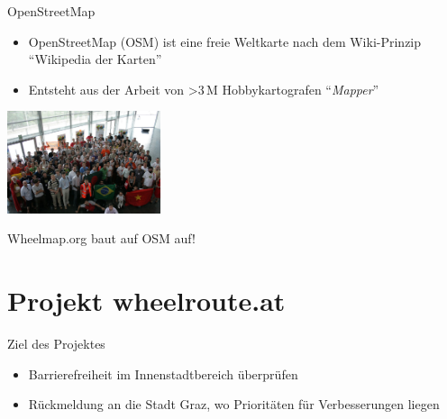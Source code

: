 \documentclass{beamer}
\begin{document}
\begin{frame}{OpenStreetMap}


  \begin{itemize}
        \item OpenStreetMap (OSM) ist eine freie Weltkarte nach dem Wiki-Prinzip "`Wikipedia der Karten"'
          \pause
            \item Entsteht aus der Arbeit von \textgreater 3\,M Hobbykartografen "`\emph{Mapper}"'
          \end{itemize}

           \begin{center}
              \includegraphics[width=4.5cm]{sotm.jpg}
               \end{center}

             \pause
  Wheelmap.org baut auf OSM auf!

\end{frame}

\section{Projekt wheelroute.at}

\begin{frame}{Ziel des Projektes}

    \begin{itemize}
       \item Barrierefreiheit im Innenstadtbereich überprüfen

         \pause

      \vspace{1cm}

      \item Rückmeldung an die Stadt Graz, wo Prioritäten für Verbesserungen liegen
    \end{itemize}


\end{frame}
\end{document}
